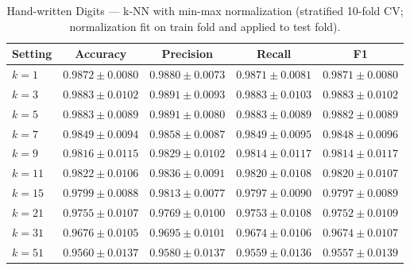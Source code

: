 \documentclass{article}
\begin{document}
\begin{table}[H]
\centering
\small
\caption{Hand-written Digits --- k-NN with min-max normalization (stratified 10-fold CV; normalization fit on train fold and applied to test fold).}
\label{tab:digits-knn-norm}
\begin{tabular}{@{}lcccc@{}}
\toprule
Setting & Accuracy & Precision & Recall & F1 \\
\midrule
$k=1$  & $0.9872 \pm 0.0080$ & $0.9880 \pm 0.0073$ & $0.9871 \pm 0.0081$ & $0.9871 \pm 0.0080$ \\
$k=3$  & $\mathbf{0.9883 \pm 0.0102}$ & $\mathbf{0.9891 \pm 0.0093}$ & $\mathbf{0.9883 \pm 0.0103}$ & $\mathbf{0.9883 \pm 0.0102}$ \\
$k=5$  & $0.9883 \pm 0.0089$ & $0.9891 \pm 0.0080$ & $0.9883 \pm 0.0089$ & $0.9882 \pm 0.0089$ \\
$k=7$  & $0.9849 \pm 0.0094$ & $0.9858 \pm 0.0087$ & $0.9849 \pm 0.0095$ & $0.9848 \pm 0.0096$ \\
$k=9$  & $0.9816 \pm 0.0115$ & $0.9829 \pm 0.0102$ & $0.9814 \pm 0.0117$ & $0.9814 \pm 0.0117$ \\
$k=11$ & $0.9822 \pm 0.0106$ & $0.9836 \pm 0.0091$ & $0.9820 \pm 0.0108$ & $0.9820 \pm 0.0107$ \\
$k=15$ & $0.9799 \pm 0.0088$ & $0.9813 \pm 0.0077$ & $0.9797 \pm 0.0090$ & $0.9797 \pm 0.0089$ \\
$k=21$ & $0.9755 \pm 0.0107$ & $0.9769 \pm 0.0100$ & $0.9753 \pm 0.0108$ & $0.9752 \pm 0.0109$ \\
$k=31$ & $0.9676 \pm 0.0105$ & $0.9695 \pm 0.0101$ & $0.9674 \pm 0.0106$ & $0.9674 \pm 0.0107$ \\
$k=51$ & $0.9560 \pm 0.0137$ & $0.9580 \pm 0.0137$ & $0.9559 \pm 0.0136$ & $0.9557 \pm 0.0139$ \\
\bottomrule
\end{tabular}
\end{table}
\end{document}
